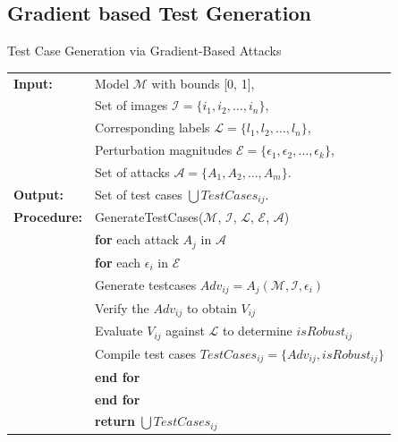 \subsection{Gradient based Test Generation}\hypertarget{Gradient}{}

\begin{algorithm}
    \caption{Test Case Generation via Gradient-Based Attacks}
    \begin{tabular}{l l}
    \textbf{Input:} & Model $\mathcal{M}$ with bounds [0, 1], \\
    & Set of images $\mathcal{I} = \{i_1, i_2, \ldots, i_n\}$, \\
    & Corresponding labels $\mathcal{L} = \{l_1, l_2, \ldots, l_n\}$, \\
    & Perturbation magnitudes $\mathcal{E} = \{\epsilon_1, \epsilon_2, \ldots, \epsilon_k\}$, \\
    & Set of attacks $\mathcal{A} = \{A_1, A_2, \ldots, A_m\}$. \\
    \textbf{Output:} & Set of test cases $\bigcup TestCases_{ij}$. \\
    \textbf{Procedure:} & GenerateTestCases($\mathcal{M}$, $\mathcal{I}$, $\mathcal{L}$, $\mathcal{E}$, $\mathcal{A}$) \\
    & \quad \textbf{for} each attack $A_j$ in $\mathcal{A}$ \\
    & \quad \quad \textbf{for} each $\epsilon_i$ in $\mathcal{E}$ \\
    & \quad \quad \quad Generate testcases  $Adv_{ij} = A_j(\mathcal{M}, \mathcal{I}, \epsilon_i)$ \\
    & \quad \quad \quad Verify the $Adv_{ij}$ to obtain $V_{ij}$ \\
    & \quad \quad \quad Evaluate $V_{ij}$ against $\mathcal{L}$ to determine $isRobust_{ij}$ \\
    & \quad \quad \quad Compile test cases $TestCases_{ij} = \{Adv_{ij}, isRobust_{ij}\}$ \\
    & \quad \quad \textbf{end for} \\
    & \quad \textbf{end for} \\
    & \quad \textbf{return} $\bigcup TestCases_{ij}$ \\
    \end{tabular}
    \end{algorithm}
    
